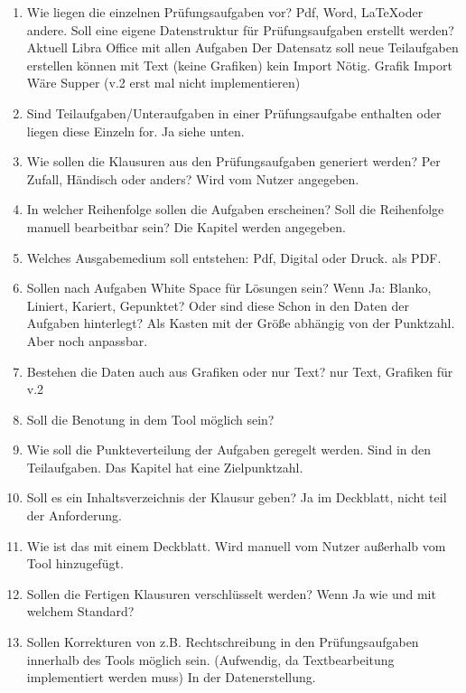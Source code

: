 \documentclass[a4paper]{article}
\begin{document}
\begin{enumerate}
    \item Wie liegen die einzelnen Prüfungsaufgaben vor? Pdf, Word, \LaTeX oder andere. Soll eine eigene Datenstruktur für Prüfungsaufgaben erstellt werden?
    \subitem Aktuell Libra Office mit allen Aufgaben
    \subitem Der Datensatz soll neue Teilaufgaben erstellen können mit Text (keine Grafiken) kein Import Nötig.
    \subitem Grafik Import Wäre Supper (v.2 erst mal nicht implementieren)
    \item Sind Teilaufgaben/Unteraufgaben in einer Prüfungsaufgabe enthalten oder liegen diese Einzeln for.
    \subitem Ja siehe unten.
    \item Wie sollen die Klausuren aus den Prüfungsaufgaben generiert werden? Per Zufall, Händisch oder anders?
    \subitem Wird vom Nutzer angegeben.
    \item In welcher Reihenfolge sollen die Aufgaben erscheinen? Soll die Reihenfolge manuell bearbeitbar sein?
    \subitem Die Kapitel werden angegeben.
    \item Welches Ausgabemedium soll entstehen: Pdf, Digital oder Druck.
    \subitem als PDF.
    \item Sollen nach Aufgaben White Space für Lösungen sein? Wenn Ja: Blanko, Liniert, Kariert, Gepunktet? Oder sind diese Schon in den Daten der Aufgaben hinterlegt?
    \subitem Als Kasten mit der Größe abhängig von der Punktzahl. Aber noch anpassbar.
    \item Bestehen die Daten auch aus Grafiken oder nur Text?
    \subitem nur Text, Grafiken für v.2
    \item Soll die Benotung in dem Tool möglich sein?
    \subitem 
    \item Wie soll die Punkteverteilung der Aufgaben geregelt werden.
    \subitem Sind in den Teilaufgaben. Das Kapitel hat eine Zielpunktzahl.
    \item Soll es ein Inhaltsverzeichnis der Klausur geben?
    \subitem Ja im Deckblatt, nicht teil der Anforderung.
    \item Wie ist das mit einem Deckblatt.
    \subitem Wird manuell vom Nutzer außerhalb vom Tool hinzugefügt.
    \item Sollen die Fertigen Klausuren verschlüsselt werden? Wenn Ja wie und mit welchem Standard?
    \subitem 
    \item Sollen Korrekturen von z.B. Rechtschreibung in den Prüfungsaufgaben innerhalb des Tools möglich sein. (Aufwendig, da Textbearbeitung implementiert werden muss)
    \subitem In der Datenerstellung.

\end{enumerate}
\end{document}
